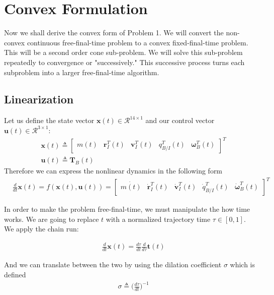 \chapter{Convex Formulation}
\label{convex}

Now we shall derive the convex form of Problem 1. We will convert the non-convex continuous free-final-time problem to a convex fixed-final-time problem. This will be a second order cone sub-problem. We will solve this sub-problem repeatedly to convergence or "successively." This successive process turns each subproblem into a larger free-final-time algorithm.

\section{Linearization}
Let us define the state vector $\mathbf{x}(t) \in \mathcal{R}^{14\times 1}$ and our control vector $\mathbf{u}(t) \in \mathcal{R}^{3\times 1}$:
\begin{align}
& \mathbf{x}(t) \triangleq 
	\begin{bmatrix}
	m(t) & \mathbf{r}_I^T(t) & \mathbf{v}_I^T(t) & q_{B/I}^T(t) & \bm{\omega}_B^T(t)   
	\end{bmatrix}^T \\
& \mathbf{u}(t) \triangleq \mathbf{T}_B(t)  
\end{align}
Therefore we can express the nonlinear dynamics in the following form
\begin{align}
& \frac{d}{dt}\mathbf{x}(t) = f(\mathbf{x}(t), \mathbf{u}(t)) =  
	\begin{bmatrix}
	\dot{m(t)} & \dot{\mathbf{r}}_I^T(t) & \dot{\mathbf{v}}_I^T(t) & \dot{q}_{B/I}^T(t) & \dot{\bm{\omega}}_B^T(t)  
	\end{bmatrix}^T
\end{align}

In order to make the problem free-final-time, we must manipulate the how time works. We are going to replace $t$ with a normalized trajectory time $\tau \in \left[0,1\right]$. We apply the chain run:


\begin{align}
& \frac{d}{dt}\mathbf{x}(t) = \frac{d\tau}{dt} \frac{d}{d\tau}\mathbf{t}(t)
\end{align}

And we can translate between the two by using the dilation coefficient $\sigma$ which is defined
\begin{align}
& \sigma \triangleq \Big(\frac{d\tau}{dt}\Big)^{-1}
\end{align}

